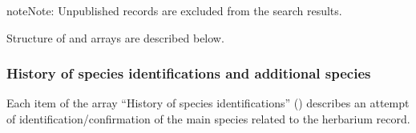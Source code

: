 \documentclass[letterpaper,10pt,english]{sphinxmanual}
\begin{document}
\begin{sphinxadmonition}{note}{Note:}
Unpublished records are excluded from the search results.
\end{sphinxadmonition}

Structure of  and  arrays are described below.


\subsubsection{History of species identifications and additional species}
\label{\detokenize{http_api:history-of-species-identifications-and-additional-species}}

Each item of the array “History of species identifications” ()
describes an attempt of identification/confirmation
of the main species related to the herbarium record.
\end{document}
